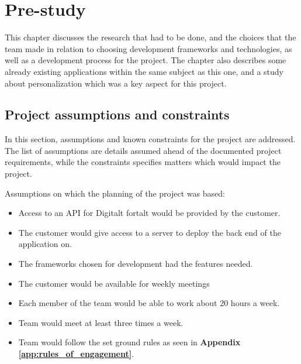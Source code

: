 
\chapter{Pre-study}

This chapter discusses the research that had to be done, and the choices that the team made in relation to choosing development frameworks and technologies, as well as a development process for the project. The chapter also describes some already existing applications within the same subject as this one, and a study about personalization which was a key aspect for this project.

\section{Project assumptions and constraints}

In this section, assumptions and known constraints for the project are addressed. The list of assumptions are details assumed ahead of the documented project requirements, while the constraints specifies matters which would impact the project.

Assumptions on which the planning of the project was based:
\begin{itemize}
	\item Access to an  API for Digitalt fortalt would be provided by the customer.
	\item The customer would give access to a server to deploy the back end of the application on.
	\item The frameworks chosen for development had the features needed.
	\item The customer would be available for weekly meetings
	\item Each member of the team would be able to work about 20 hours a week.
	\item Team would meet at least three times a week.
	\item Team would follow the set ground rules as seen in \textbf{Appendix \ref{app:rules_of_engagement}}.
\end{itemize}


